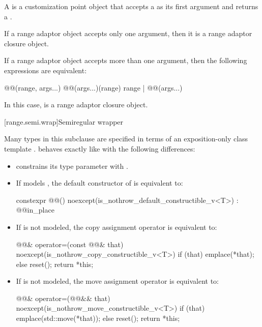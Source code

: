 \pnum
A  is a
customization point object
that accepts a  as its first argument and returns a
.

\pnum
If a range adaptor object accepts only one argument,
then it is a range adaptor closure object.

\pnum
If a range adaptor object accepts more than one argument,
then the following expressions are equivalent:

\begin{codeblock}
@@(range, args...)
@@(args...)(range)
range | @@(args...)
\end{codeblock}

In this case,  is a range adaptor
closure object.

[range.semi.wrap]{Semiregular wrapper}

\pnum
Many types in this subclause are specified in terms of
an exposition-only class template .
 behaves exactly like 
with the following differences:
\begin{itemize}
\item {} constrains
its type parameter  with
.

\item If  models , the default
constructor of  is equivalent to:
\begin{codeblock}
constexpr @@() noexcept(is_nothrow_default_constructible_v<T>)
  : @@{in_place}
{ }
\end{codeblock}

\item If  is not
modeled, the copy assignment operator is equivalent to:
\begin{codeblock}
@@& operator=(const @@& that)
  noexcept(is_nothrow_copy_constructible_v<T>)
{
  if (that) emplace(*that);
  else reset();
  return *this;
}
\end{codeblock}

\item If  is not modeled,
the move assignment operator is equivalent to:
\begin{codeblock}
@@& operator=(@@&& that)
  noexcept(is_nothrow_move_constructible_v<T>)
{
  if (that) emplace(std::move(*that));
  else reset();
  return *this;
}
\end{codeblock}
\end{itemize}

